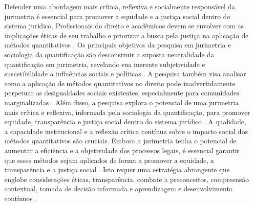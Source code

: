 \begin{agradecimentos}
    Defender uma abordagem mais crítica, reflexiva e socialmente responsável da jurimetria é essencial para promover a equidade e a justiça social dentro do sistema jurídico. Profissionais do direito e acadêmicos devem se envolver com as implicações éticas de seu trabalho e priorizar a busca pela justiça na aplicação de métodos quantitativos \cite{10.1007/s11186-021-09453-1,10.3390/fi9040068}. Os principais objetivos da pesquisa em jurimetria e sociologia da quantificação são desconstruir a suposta neutralidade da quantificação em jurimetria, revelando sua inerente subjetividade e suscetibilidade a influências sociais e políticas \cite{10.1007/s11186-021-09453-1,10.3390/ fi9040068}. A pesquisa também visa analisar como a aplicação de métodos quantitativos no direito pode inadvertidamente perpetuar as desigualdades sociais existentes, especialmente para comunidades marginalizadas \cite{10.1007/s11186-021-09453-1,10.3390/fi9040068}. Além disso, a pesquisa explora o potencial de uma jurimetria mais crítica e reflexiva, informada pela sociologia da quantificação, para promover equidade, transparência e justiça social dentro do sistema jurídico \cite{10.1007/s11186-021-09453-1,10.3390/ fi9040068}. A qualidade, a capacidade institucional e a reflexão crítica contínua sobre o impacto social dos métodos quantitativos são cruciais. Embora a jurimetria tenha o potencial de aumentar a eficiência e a objetividade dos processos legais, é essencial garantir que esses métodos sejam aplicados de forma a promover a equidade, a transparência e a justiça social \cite{10.1590/dados.2022.65.3.267,1023071190721}. Isto requer uma estratégia abrangente que englobe considerações éticas, transparência, combate a preconceitos, compreensão contextual, tomada de decisão informada e aprendizagem e desenvolvimento contínuos \cite{10.1590/dados.2022.65.3.267,1023071190721}. 
    
\end{agradecimentos}

